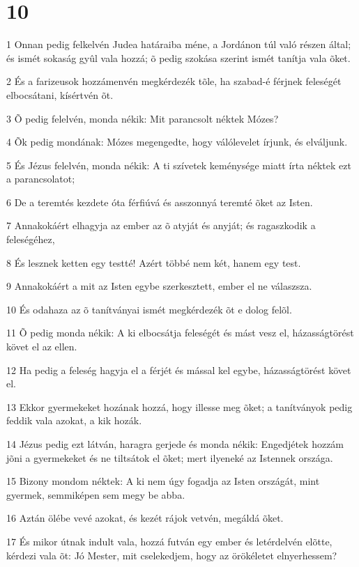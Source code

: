 \chapter{10}

\par 1 Onnan pedig felkelvén Judea határaiba méne, a Jordánon túl való részen által; és ismét sokaság gyûl vala hozzá; õ pedig szokása szerint ismét tanítja vala õket.
\par 2 És a farizeusok hozzámenvén megkérdezék tõle, ha szabad-é férjnek feleségét elbocsátani, kísértvén õt.
\par 3 Õ pedig felelvén, monda nékik: Mit parancsolt néktek Mózes?
\par 4 Õk pedig mondának: Mózes megengedte, hogy válólevelet írjunk, és elváljunk.
\par 5 És Jézus felelvén, monda nékik: A ti szívetek keménysége miatt írta néktek ezt a parancsolatot;
\par 6 De a teremtés kezdete óta férfiúvá és asszonnyá teremté õket az Isten.
\par 7 Annakokáért elhagyja az ember az õ atyját és anyját; és ragaszkodik a feleségéhez,
\par 8 És lesznek ketten egy testté! Azért többé nem két, hanem egy test.
\par 9 Annakokáért a mit az Isten egybe szerkesztett, ember el ne válaszsza.
\par 10 És odahaza az õ tanítványai ismét megkérdezék õt e dolog felõl.
\par 11 Õ pedig monda nékik: A ki elbocsátja feleségét és mást vesz el, házasságtörést követ el az ellen.
\par 12 Ha pedig a feleség hagyja el a férjét és mással kel egybe, házasságtörést követ el.
\par 13 Ekkor gyermekeket hozának hozzá, hogy illesse meg õket; a tanítványok pedig feddik vala azokat, a kik hozák.
\par 14 Jézus pedig ezt látván, haragra gerjede és monda nékik: Engedjétek hozzám jõni a gyermekeket és ne tiltsátok el õket; mert ilyeneké az Istennek országa.
\par 15 Bizony mondom néktek: A ki nem úgy fogadja az Isten országát, mint gyermek, semmiképen sem megy be abba.
\par 16 Aztán ölébe vevé azokat, és kezét rájok vetvén, megáldá õket.
\par 17 És mikor útnak indult vala, hozzá futván egy ember és letérdelvén elõtte, kérdezi vala õt: Jó Mester, mit cselekedjem, hogy az örökéletet elnyerhessem?
